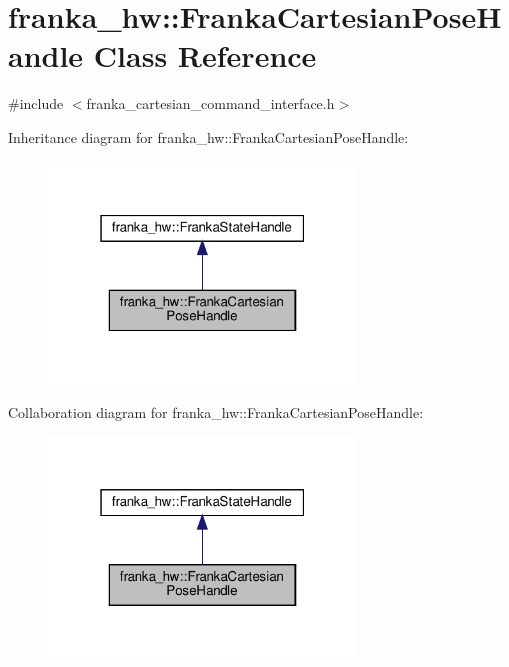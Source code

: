 \hypertarget{classfranka__hw_1_1_franka_cartesian_pose_handle}{}\section{franka\+\_\+hw\+:\+:Franka\+Cartesian\+Pose\+Handle Class Reference}
\label{classfranka__hw_1_1_franka_cartesian_pose_handle}


{\ttfamily \#include $<$franka\+\_\+cartesian\+\_\+command\+\_\+interface.\+h$>$}



Inheritance diagram for franka\+\_\+hw\+:\+:Franka\+Cartesian\+Pose\+Handle\+:
\nopagebreak
\begin{figure}[H]
\begin{center}
\leavevmode
\includegraphics[width=232pt]{classfranka__hw_1_1_franka_cartesian_pose_handle__inherit__graph}
\end{center}
\end{figure}


Collaboration diagram for franka\+\_\+hw\+:\+:Franka\+Cartesian\+Pose\+Handle\+:
\nopagebreak
\begin{figure}[H]
\begin{center}
\leavevmode
\includegraphics[width=232pt]{classfranka__hw_1_1_franka_cartesian_pose_handle__coll__graph}
\end{center}
\end{figure}

